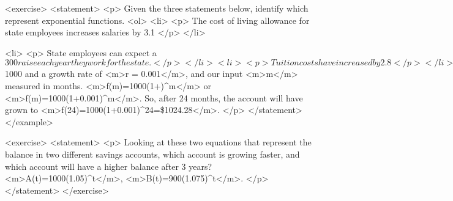         <exercise>
            <statement>
                <p>
                    Given the three statements below, identify which represent exponential functions.
                    <ol>
                        <li>
                            <p>
                                The cost of living allowance for state employees increases salaries by 3.1%
                            </p>
                        </li>

                        <li>
                            <p>
                                State employees can expect a $300 raise each year they work for the state.
                            </p>
                        </li>

                        <li>
                            <p>
                                Tuition costs have increased by 2.8%
                            </p>
                        </li>
                    </ol>
                </p>
            </statement>
        </exercise>

        <example>
            <statement>
                <p>
                    A certificate of deposit (CD) is a type of savings account offered by banks, typically offering a higher interest rate in return for a fixed length of time you will leave your money invested.
                    If a bank offers a 24 month CD with an annual interest rate of 1.2%
                </p>

                <p>
                    First, we must notice that the interest rate is an annual rate, but is compounded monthly, meaning interest is calculated and added to the account monthly.
                    To find the monthly interest rate, we divide the annual rate of 1.2%
                    Each month we will earn 0.1%
                    From this, we can set up an exponential function, with our initial amount of $1000 and a growth rate of <m>r = 0.001</m>, and our input <m>m</m> measured in months.
                    <m>f(m)=1000(1+)^{m}</m> or <m>f(m)=1000(1+0.001)^{m}</m>.
                    So, after 24 months, the account will have grown to <m>f(24)=1000(1+0.001)^{2}4=\$1024.28</m>.
                </p>
            </statement>
        </example>

        <exercise>
            <statement>
                <p>
                    Looking at these two equations that represent the balance in two different savings accounts, which account is growing faster, and which account will have a higher balance after 3 years? <m>A(t)=1000(1.05)^{t}</m>, <m>B(t)=900(1.075)^{t}</m>.
                </p>
            </statement>
        </exercise>

